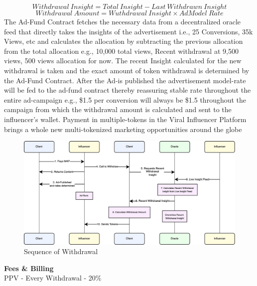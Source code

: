 \documentclass[conference]{IEEEtran}
\begin{document}
\[Withdrawal\:Insight=Total\:Insight-Last\:Withdrawn\:Insight\]
\[Withdrawal\:Amount=Wuthdrawal\:Insight \times AdModel\:Rate\]
The Ad-Fund Contract fetches the necessary data from a decentralized oracle feed that directly takes the insights of the advertisement i.e., 25 Conversions, 35k Views, etc and calculates the allocation by subtracting the previous allocation from the total allocation e.g., 10,000 total views, Recent withdrawal at 9,500 views, 500 views allocation for now. The recent Insight calculated for the new withdrawal is taken and the exact amount of token withdrawal is determined by the Ad-Fund Contract. After the Ad-is published the advertisement model-rate will be fed to the ad-fund contract thereby reassuring stable rate throughout the entire ad-campaign e.g., \$1.5 per conversion will always be \$1.5 throughout the campaign from which the withdrawal amount is calculated and sent to the influencer's wallet. Payment in multiple-tokens in the Viral Influencer Platform brings a whole new multi-tokenized marketing opportunities around the globe\\

\begin{figure}
\begin{center}
\includegraphics[width=12cm]{periodic-allocation-2}
\caption{Sequence of Withdrawal}
\end{center}
\end{figure}

\textbf{Fees \& Billing}\\

PPV - Every Withdrawal - 20\%\\
\end{document}
